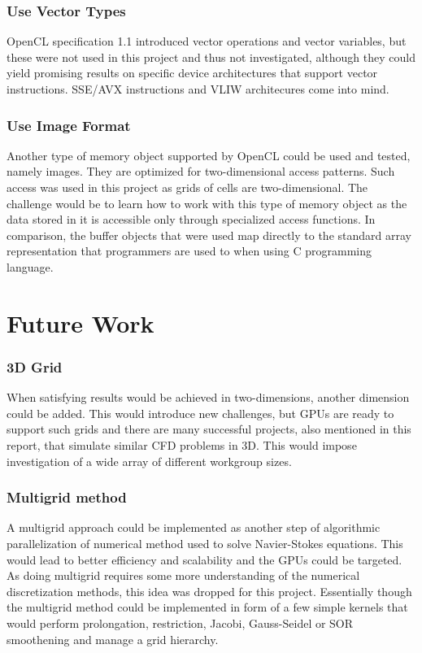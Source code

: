 \subsubsection{Use Vector Types}
OpenCL specification 1.1 introduced vector operations and vector variables, but these were not used in this project and thus not investigated, although they could yield promising results on specific device architectures that support vector instructions. SSE/AVX instructions and VLIW architecures come into mind. 


\subsubsection{Use Image Format}
Another type of memory object supported by OpenCL could be used and tested, namely images. They are optimized for two-dimensional access patterns. Such access was used in this project as grids of cells are two-dimensional. The challenge would be to learn how to work with this type of memory object as the data stored in it is accessible only through specialized access functions. In comparison, the buffer objects that were used map directly to the standard array representation that programmers are used to when using C programming language.

\section{Future Work}

\subsubsection{3D Grid}
When satisfying results would be achieved in two-dimensions, another dimension could be added. This would introduce new challenges, but GPUs are ready to support such grids and there are many successful projects, also mentioned in this report, that simulate similar CFD problems in 3D. This would impose investigation of a wide array of different workgroup sizes.

\subsubsection{Multigrid method}
A multigrid approach could be implemented as another step of algorithmic parallelization of numerical method used to solve Navier-Stokes equations. This would lead to better efficiency and scalability and the GPUs could be targeted. As doing multigrid requires some more understanding of the numerical discretization methods, this idea was dropped for this project. Essentially though the multigrid method could be implemented in form of a few simple kernels that would perform prolongation, restriction, Jacobi, Gauss-Seidel or SOR smoothening and manage a grid hierarchy.

